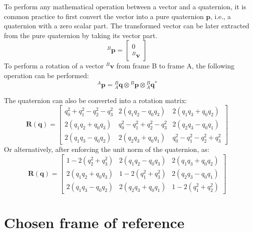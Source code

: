 To perform any mathematical operation between a vector and a quaternion, it is common practice to first convert the vector into a pure quaternion $\boldsymbol{p}$, i.e., a quaternion with a zero scalar part. The transformed vector can be later extracted from the pure quaternion by taking its vector part.
\begin{equation}
	{}^{B}\boldsymbol{p} = \begin{bmatrix} 0 \\ {}^{B}\boldsymbol{v} \end{bmatrix}
	\label{eq:qt:vec}
\end{equation}
To perform a rotation of a vector ${}^{B}\boldsymbol{v}$ from frame B to frame A, the following operation can be performed:
\begin{equation}
	{}^{A}\boldsymbol{p} = {}^{B}_{A}\boldsymbol
	{q} \otimes {}^{B}\boldsymbol{p} \otimes {}^{B}_{A}\boldsymbol{q}^*
	\label{eq:qt:rot2}
\end{equation}

The quaternion can also be converted into a rotation matrix:
\begin{equation}
	\boldsymbol{R}(\boldsymbol{q}) = \begin{bmatrix}
		q_0^2 + q_1^2 - q_2^2 - q_3^2 & 2(q_1q_2 - q_0q_3)            & 2(q_1q_3 + q_0q_2)            \\
		2(q_1q_2 + q_0q_3)            & q_0^2 - q_1^2 + q_2^2 - q_3^2 & 2(q_2q_3 - q_0q_1)            \\
		2(q_1q_3 - q_0q_2)            & 2(q_2q_3 + q_0q_1)            & q_0^2 - q_1^2 - q_2^2 + q_3^2
	\end{bmatrix}
	\label{eq:q_mat}
\end{equation}
Or alternatively, after enforcing the unit norm of the quaternion, as:
\begin{equation}
	\boldsymbol{R}(\boldsymbol{q}) = \begin{bmatrix}
		1 - 2(q_2^2 + q_3^2) & 2(q_1q_2 - q_0q_3)   & 2(q_1q_3 + q_0q_2)   \\
		2(q_1q_2 + q_0q_3)   & 1 - 2(q_1^2 + q_3^2) & 2(q_2q_3 - q_0q_1)   \\
		2(q_1q_3 - q_0q_2)   & 2(q_2q_3 + q_0q_1)   & 1 - 2(q_1^2 + q_2^2)
	\end{bmatrix}
	\label{eq:q_mat_1}
\end{equation}


\section{Chosen frame of reference}

